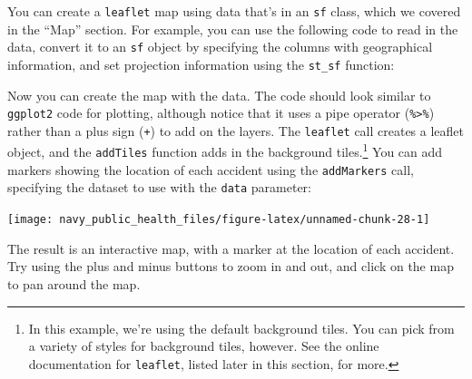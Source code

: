 \documentclass[]{tufte-book}
\newenvironment{Shaded}{}{}
\newcommand{\DataTypeTok}[1]{\textcolor[rgb]{0.56,0.13,0.00}{#1}}
\newcommand{\DecValTok}[1]{\textcolor[rgb]{0.25,0.63,0.44}{#1}}
\newcommand{\KeywordTok}[1]{\textcolor[rgb]{0.00,0.44,0.13}{\textbf{#1}}}
\newcommand{\NormalTok}[1]{#1}
\newcommand{\OperatorTok}[1]{\textcolor[rgb]{0.40,0.40,0.40}{#1}}
\newcommand{\StringTok}[1]{\textcolor[rgb]{0.25,0.44,0.63}{#1}}
\begin{document}
You can create a \texttt{leaflet} map using data that's in an \texttt{sf} class, which we covered in the ``Map''
section. For example, you can use the following code to read in the data, convert it to an \texttt{sf}
object by specifying the columns with geographical information, and set projection information
using the \texttt{st\_sf} function:

\begin{Shaded}
\end{Shaded}

Now you can create the map with the data. The code should look similar to \texttt{ggplot2} code for
plotting, although notice that it uses a pipe operator (\texttt{\%\textgreater{}\%}) rather than a plus sign (\texttt{+}) to
add on the layers. The \texttt{leaflet} call creates a leaflet object, and the \texttt{addTiles} function adds in
the background tiles.\footnote{In this example, we're using the default background tiles. You can pick from
  a variety of styles for background tiles, however. See the online documentation for \texttt{leaflet},
  listed later in this section, for more.} You can add markers showing the location of each accident
using the \texttt{addMarkers} call, specifying the dataset to use with the \texttt{data} parameter:

\begin{Shaded}
\end{Shaded}

\texttt{[image: navy\_public\_health\_files/figure-latex/unnamed-chunk-28-1]}

The result is an interactive map, with a marker at the location of each accident. Try using the
plus and minus buttons to zoom in and out, and click on the map to pan around the map.
\end{document}
